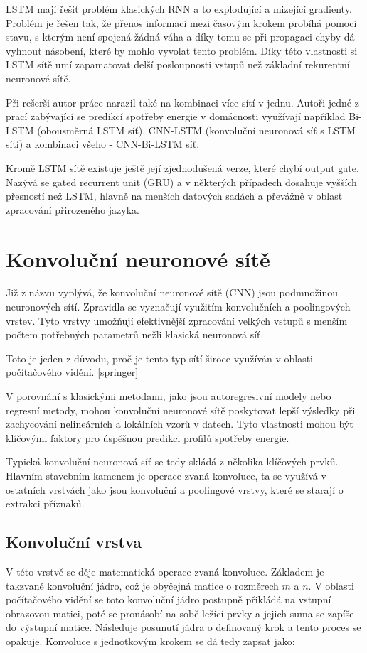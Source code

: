 \documentclass[FM,BP,fonts]{tulthesis}
\begin{document}
LSTM mají řešit problém klasických RNN a to explodující a mizející gradienty. Problém je řešen tak, že přenos informací mezi časovým krokem probíhá pomocí stavu, s kterým není spojená žádná váha a díky tomu se při propagaci chyby dá vyhnout násobení, které by mohlo vyvolat tento problém. Díky této vlastnosti si LSTM sítě umí zapamatovat delší posloupnosti vstupů než základní rekurentní neuronové sítě.

Při rešerši autor práce narazil také na kombinaci více sítí v jednu. Autoři jedné z prací zabývající se predikcí spotřeby energie v domácnosti \cite{cnn-bi-lstm}	 využívají například Bi-LSTM (obousměrná LSTM síť), CNN-LSTM (konvoluční neuronová síť s LSTM sítí) a kombinaci všeho - CNN-Bi-LSTM síť.

Kromě LSTM sítě existuje ještě její zjednodušená verze, které chybí output gate. Nazývá se gated recurrent unit (GRU) a v některých případech dosahuje vyšších přesností než LSTM, hlavně na menších datových sadách a převážně v oblast zpracování přirozeného jazyka. \cite{kynych2018vyuziti}

\section{Konvoluční neuronové sítě}
Již z názvu vyplývá, že konvoluční neuronové sítě (CNN) jsou podmnožinou neuronových sítí. Zpravidla se vyznačují využitím konvolučních a poolingových vrstev. Tyto vrstvy umožňují efektivnější zpracování velkých vstupů s menším počtem potřebných parametrů nežli klasická neuronová síť. 

Toto je jeden z důvodu, proč je tento typ sítí široce využíván v oblasti počítačového vidění. \ref{springer}

V porovnání s klasickými metodami, jako jsou autoregresivní modely nebo regresní metody, mohou konvoluční neuronové sítě poskytovat lepší výsledky při zachycování nelineárních a lokálních vzorů v datech. Tyto vlastnosti mohou být klíčovými faktory pro úspěšnou predikci profilů spotřeby energie.

Typická konvoluční neuronová síť se tedy skládá z několika klíčových prvků. Hlavním stavebním kamenem je operace zvaná konvoluce, ta se využívá v ostatních vrstvách jako jsou konvoluční a poolingové vrstvy, které se starají o extrakci příznaků.

\subsection{Konvoluční vrstva}
V této vrstvě se děje matematická operace zvaná konvoluce. Základem je takzvané konvoluční jádro, což je obyčejná matice o rozměrech $m$ a $n$. V oblasti počítačového vidění se toto konvoluční jádro postupně přikládá na vstupní obrazovou matici, poté se pronásobí na sobě ležící prvky a jejich suma se zapíše do výstupní matice. Následuje posunutí jádra o definovaný krok a tento proces se opakuje. Konvoluce s jednotkovým krokem se dá tedy zapsat jako:
\end{document}
